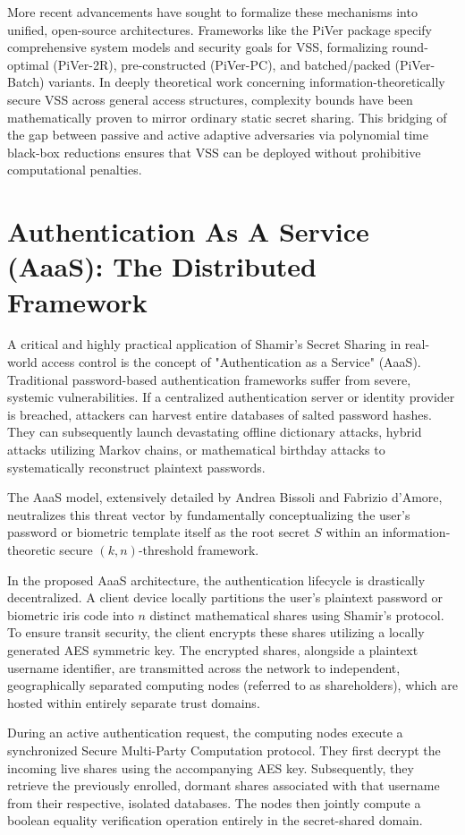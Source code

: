 \documentclass[11pt, a4paper]{article}
\begin{document}
More recent advancements have sought to formalize these mechanisms into unified, open-source architectures. Frameworks like the PiVer package specify comprehensive system models and security goals for VSS, formalizing round-optimal (PiVer-2R), pre-constructed (PiVer-PC), and batched/packed (PiVer-Batch) variants. In deeply theoretical work concerning information-theoretically secure VSS across general access structures, complexity bounds have been mathematically proven to mirror ordinary static secret sharing. This bridging of the gap between passive and active adaptive adversaries via polynomial time black-box reductions ensures that VSS can be deployed without prohibitive computational penalties.

\section*{Authentication As A Service (AaaS): The Distributed Framework}
A critical and highly practical application of Shamir's Secret Sharing in real-world access control is the concept of "Authentication as a Service" (AaaS). Traditional password-based authentication frameworks suffer from severe, systemic vulnerabilities. If a centralized authentication server or identity provider is breached, attackers can harvest entire databases of salted password hashes. They can subsequently launch devastating offline dictionary attacks, hybrid attacks utilizing Markov chains, or mathematical birthday attacks to systematically reconstruct plaintext passwords.

The AaaS model, extensively detailed by Andrea Bissoli and Fabrizio d'Amore, neutralizes this threat vector by fundamentally conceptualizing the user's password or biometric template itself as the root secret $S$ within an information-theoretic secure $(k, n)$-threshold framework.

In the proposed AaaS architecture, the authentication lifecycle is drastically decentralized. A client device locally partitions the user's plaintext password or biometric iris code into $n$ distinct mathematical shares using Shamir's protocol. To ensure transit security, the client encrypts these shares utilizing a locally generated AES symmetric key. The encrypted shares, alongside a plaintext username identifier, are transmitted across the network to independent, geographically separated computing nodes (referred to as shareholders), which are hosted within entirely separate trust domains.

During an active authentication request, the computing nodes execute a synchronized Secure Multi-Party Computation protocol. They first decrypt the incoming live shares using the accompanying AES key. Subsequently, they retrieve the previously enrolled, dormant shares associated with that username from their respective, isolated databases. The nodes then jointly compute a boolean equality verification operation entirely in the secret-shared domain.
\end{document}
